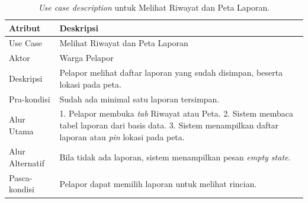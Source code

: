 \begin{table}[htbp]
\centering
\caption{\textit{Use case description} untuk Melihat Riwayat dan Peta Laporan.}
\label{tab:uc-riwayat}
\begin{tabular}{p{3.5cm} p{9cm}}
\toprule
\textbf{Atribut} & \textbf{Deskripsi} \\
\midrule
Use Case & Melihat Riwayat dan Peta Laporan \\
Aktor & Warga Pelapor \\
Deskripsi & Pelapor melihat daftar laporan yang sudah disimpan, beserta lokasi pada peta. \\
Pra-kondisi & Sudah ada minimal satu laporan tersimpan. \\
Alur Utama & 1. Pelapor membuka \textit{tab} Riwayat atau Peta. 2. Sistem membaca tabel laporan dari basis data. 3. Sistem menampilkan daftar laporan atau \textit{pin} lokasi pada peta. \\
Alur Alternatif & Bila tidak ada laporan, sistem menampilkan pesan \textit{empty state}. \\
Pasca-kondisi & Pelapor dapat memilih laporan untuk melihat rincian. \\
\bottomrule
\end{tabular}
\end{table}
